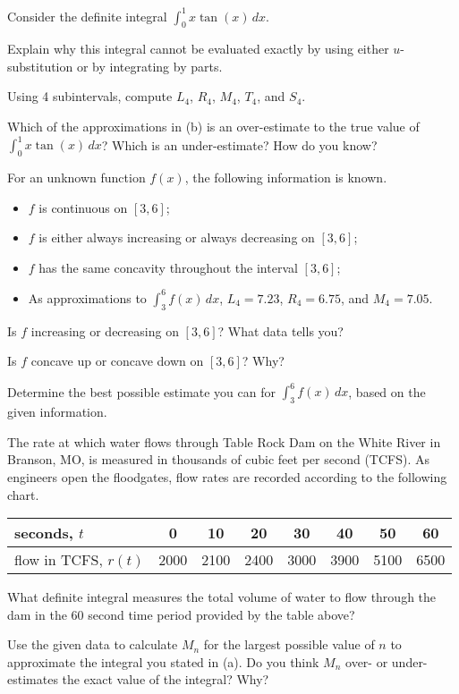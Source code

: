 \begin{exercises} 
  \item Consider the definite integral $\int_0^1 x \tan(x) \, dx$.
  \ba
  	\item Explain why this integral cannot be evaluated exactly by using either $u$-substitution or by integrating by parts.
	\item Using 4 subintervals, compute $L_4$, $R_4$, $M_4$, $T_4$, and $S_4$.  
	\item Which of the approximations in (b) is an over-estimate to the true value of $\int_0^1 x \tan(x) \, dx$?  Which is an under-estimate?  How do you know?
  \ea
  
  \item For an unknown function $f(x)$, the following information is known.  
  \begin{itemize}
  	\item $f$ is continuous on $[3,6]$;
	\item $f$ is either always increasing or always decreasing on $[3,6]$;
	\item $f$ has the same concavity throughout the interval $[3,6]$;
	\item As approximations to $\int_3^6 f(x) \, dx$, $L_4 = 7.23$, $R_4 = 6.75$, and $M_4 = 7.05$.
  \end{itemize}
  \ba
  	\item Is $f$ increasing or decreasing on $[3,6]$?  What data tells you?
	\item Is $f$ concave up or concave down on $[3,6]$?  Why?
	\item Determine the best possible estimate you can for $\int_3^6 f(x) \, dx$, based on the given information.
  \ea
  
  \item The rate at which water flows through Table Rock Dam on the White River in Branson, MO, is measured in thousands of cubic feet per second (TCFS).  As engineers open the floodgates, flow rates are recorded according to the following chart.
  \begin{center}
\begin{tabular}{|l|c|c|c|c|c|c|c|}
\hline
seconds, $t$ & 0 & 10 & 20 & 30 & 40 & 50 & 60 \\
\hline
flow in TCFS, $r(t)$ & 2000 & 2100 & 2400 & 3000 & 3900 & 5100 & 6500 \\
\hline
\end{tabular}
\end{center}
	\ba
		\item What definite integral measures the total volume of water to flow through the dam in the 60 second time period provided by the table above?
		\item Use the given data to calculate $M_n$ for the largest possible value of $n$ to approximate the integral you stated in (a).  Do you think $M_n$ over- or under-estimates the exact value of the integral?  Why?
		

\end{exercises}

